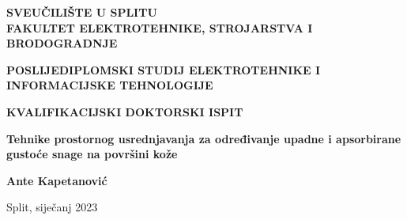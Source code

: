 \protect\thispagestyle{empty}
\begin{titlepage}
\begin{center}

\normalsize
\textbf{SVEUČILIŠTE U SPLITU\\
FAKULTET ELEKTROTEHNIKE, STROJARSTVA I BRODOGRADNJE}

\vspace{1cm}

\textbf{POSLIJEDIPLOMSKI STUDIJ ELEKTROTEHNIKE I INFORMACIJSKE TEHNOLOGIJE}

\vfill

\textbf{KVALIFIKACIJSKI DOKTORSKI ISPIT}

\vspace{2cm}

\Large
\textbf{Tehnike prostornog usrednjavanja za određivanje upadne i apsorbirane gustoće snage na površini kože}


\vspace{2cm}

\normalsize 
\textbf{Ante Kapetanović}

\vfill

\normalsize
Split, siječanj 2023

\end{center}
\end{titlepage}